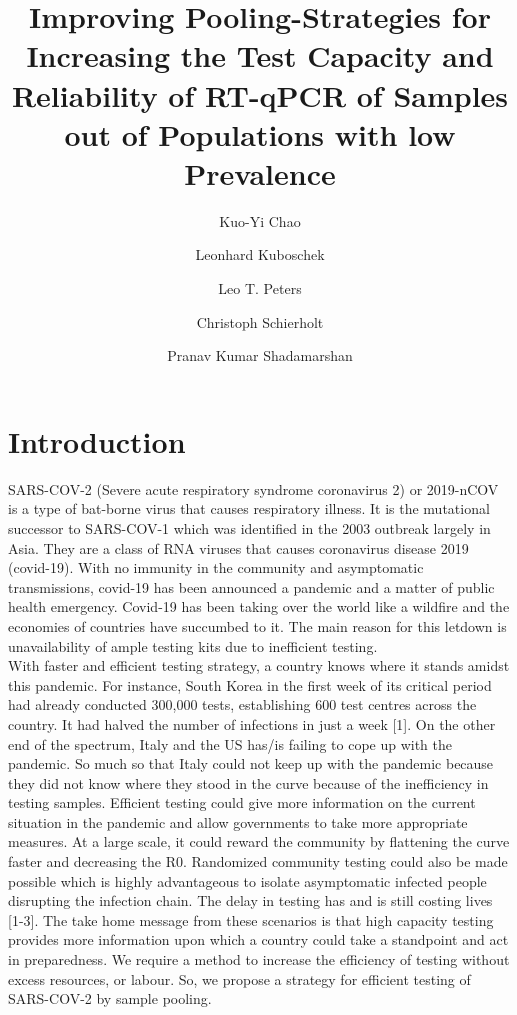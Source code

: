 \documentclass[fleqn,10pt]{wlscirep}
\title{Improving Pooling-Strategies for Increasing the Test Capacity and Reliability of RT-qPCR of Samples out of Populations with low Prevalence}
\author[*]{Kuo-Yi Chao}
\author[*]{Leonhard Kuboschek}
\author[*]{Leo T. Peters}
\author[*]{Christoph Schierholt}
\author[*]{Pranav Kumar Shadamarshan}
\affil[*]{All authors are equal in this report, the names are sorted alphabetically by last name}
\begin{document}
\flushbottom
\maketitle

\thispagestyle{empty}

\section{Introduction}

SARS-COV-2 (Severe acute respiratory syndrome coronavirus 2) or 2019-nCOV is a type of bat-borne virus that causes respiratory illness. It is the mutational successor to SARS-COV-1 which was identified in the 2003 outbreak largely in Asia. They are a class of RNA viruses that causes coronavirus disease 2019 (covid-19). With no immunity in the community and asymptomatic transmissions, covid-19 has been announced a pandemic and a matter of public health emergency. Covid-19 has been taking over the world like a wildfire and the economies of countries have succumbed to it. The main reason for this letdown is unavailability of ample testing kits due to inefficient testing.\\

With faster and efficient testing strategy, a country knows where it stands amidst this pandemic. For instance, South Korea in the first week of its critical period had already conducted 300,000 tests, establishing 600 test centres across the country. It had halved the number of infections in just a week [1]. On the other end of the spectrum, Italy and the US has/is failing to cope up with the pandemic. So much so that Italy could not keep up with the pandemic because they did not know where they stood in the curve because of the inefficiency in testing samples. Efficient testing could give more information on the current situation in the pandemic and allow governments to take more appropriate measures. At a large scale, it could reward the community by flattening the curve faster and decreasing the R0. Randomized community testing could also be made possible which is highly advantageous to isolate asymptomatic infected people disrupting the infection chain. The delay in testing has and is still costing lives [1-3]. The take home message from these scenarios is that high capacity testing provides more information upon which a country could take a standpoint and act in preparedness. We require a method to increase the efficiency of testing without excess resources, or labour. So, we propose a strategy for efficient testing of SARS-COV-2 by sample pooling.
\end{document}
